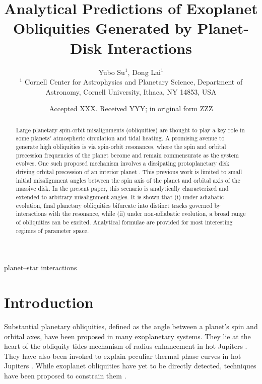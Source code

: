 \documentclass[
        fleqn,
        usenatbib,
    ]{mnras}
\title[Analytical Exoplanet Obliquities]{Analytical Predictions of Exoplanet
Obliquities Generated by Planet-Disk Interactions}
\author[Y. Su and D. Lai]{
Yubo Su$^1$,
Dong Lai$^1$
\\
$^1$ Cornell Center for Astrophysics and Planetary Science, Department of
Astronomy, Cornell University, Ithaca, NY 14853, USA
}
\date{Accepted XXX\@. Received YYY\@; in original form ZZZ}
\begin{document}
\label{firstpage}
\pagerange{\pageref{firstpage}--\pageref{lastpage}}
\maketitle

\begin{abstract}
    Large planetary spin-orbit misalignments (obliquities) are thought to play a
    key role in some planets' atmospheric circulation and tidal heating. A
    promising avenue to generate high obliquities is via spin-orbit resonances,
    where the spin and orbital precession frequencies of the planet become and
    remain commensurate as the system evolves. One such proposed mechanism
    involves a dissipating protoplanetary disk driving orbital precession of an
    interior planet \citep{millholland_disk}. This previous work is limited to
    small initial misalignment angles between the spin axis of the planet and
    orbital axis of the massive disk. In the present paper, this scenario is
    analytically characterized and extended to arbitrary misalignment angles. It
    is shown that (i) under adiabatic evolution, final planetary obliquities
    bifurcate into distinct tracks governed by interactions with the resonance,
    while (ii) under non-adiabatic evolution, a broad range of obliquities can
    be excited. Analytical formulae are provided for most interesting regimes of
    parameter space.
\end{abstract}

\begin{keywords}
planet--star interactions %
\end{keywords}

\section{Introduction}\label{s:intro}

Substantial planetary obliquities, defined as the angle between a planet's spin
and orbital axes, have been proposed in many exoplanetary systems. They lie at
the heart of the obliquity tides mechanism of radius enhancement in hot Jupiters
\citep{winn_otides, fabrycky_otides, millholland_wasp12b}. They have also been
invoked to explain peculiar thermal phase curves in hot Jupiters \citep[see
e.g.][]{millholland_signatures, ohno_infer_obl}. While exoplanet obliquities
have yet to be directly detected, techniques have been proposed to constrain
them \citep[see e.g.][]{schwarz_infer_obl, rauscher_infer_obl}.
\end{document}
